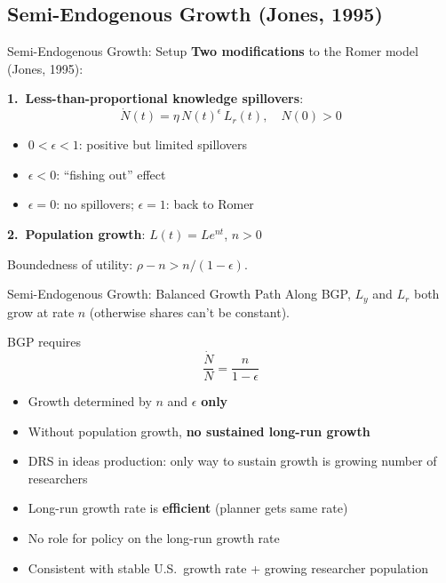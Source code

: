 \documentclass[blue]{beamer}
\begin{document}
	\subsection{Semi-Endogenous Growth (Jones, 1995)}
	
	\begin{frame}{Semi-Endogenous Growth: Setup}
		\textbf{Two modifications} to the Romer model (Jones, 1995):
		
		\textbf{1.\ Less-than-proportional knowledge spillovers}:
		\[
		\dot{N}(t) = \eta\, N(t)^\epsilon\, L_r(t), \quad N(0) > 0 
		\]
		\begin{itemize}
			\item $0 < \epsilon < 1$: positive but limited spillovers
			\item $\epsilon < 0$: ``fishing out'' effect
			\item $\epsilon = 0$: no spillovers; $\epsilon = 1$: back to Romer
		\end{itemize}
		
		\textbf{2.\ Population growth}: $L(t) = Le^{nt}$, $n > 0$
		
		\bigskip
		Boundedness of utility: $\rho - n > n/(1-\epsilon)$.
	\end{frame}
	
	\begin{frame}{Semi-Endogenous Growth: Balanced Growth Path}
		Along BGP, $L_y$ and $L_r$ both grow at rate $n$ (otherwise shares can't be constant).
		
		BGP requires
		\[
		\frac{\dot{N}}{N} =  \frac{n}{1-\epsilon}
		\]
		\begin{itemize}
			\item Growth determined by $n$ and $\epsilon$ \textbf{only}
			\item Without population growth, \textbf{no sustained long-run growth}
			\item DRS in ideas production: only way to sustain growth is growing number of researchers
			\item Long-run growth rate is \textbf{efficient} (planner gets same rate)
			\item No role for policy on the long-run growth rate
			\item Consistent with stable U.S.\ growth rate + growing researcher population
		\end{itemize}
	\end{frame}
	
\end{document}
